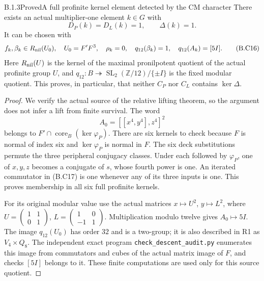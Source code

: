 \begin{result}{B.1.3}{Proved}{A full profinite kernel element detected by the CM character}
There exists an actual multiplier-one element $k\in G$ with
\[
                   D_P(k)=D_L(k)=1,\qquad\Delta(k)=1.
 \tag{B.C15}
\]
It can be chosen with
\[
 f_k,\beta_k\in R_{\rm nil}(U_0),\quad
 U_0=F'F^3,\quad \rho_k=0,\quad
 q_{12}(\beta_k)=1,\quad q_{12}(A_k)=[5I].
 \tag{B.C16}
\]
Here $R_{\rm nil}(U)$ is the kernel of the maximal
pronilpotent quotient of the actual profinite group $U$,
and $q_{12}:B\twoheadrightarrow
\operatorname{SL}_2(\mathbb Z/12)/\{\pm I\}$ is the fixed
modular quotient.  This proves, in particular, that neither
$C_P$ nor $C_L$ contains $\ker\Delta$.
\end{result}
\begin{proof}
We verify the actual source of the relative lifting theorem,
so the argument does not infer a lift from finite survival.
The word
\[
                       A_0=[[x^4,y^4],z^4]^2              \tag{B.C17}
\]
belongs to $F'\cap\operatorname{core}_B(\ker\varphi_P)$.
There are six kernels to check because $F$ is normal of
index six and $\ker\varphi_P$ is normal in $F$.
The six deck substitutions permute the three peripheral
conjugacy classes.  Under each followed by $\varphi_P$,
one of $x,y,z$ becomes a conjugate of $s$, whose fourth
power is one.  An iterated commutator in (B.C17) is one
whenever any of its three inputs is one.  This proves
membership in all six full profinite kernels.

For its original modular value use the actual matrices
$x\mapsto U^2$, $y\mapsto L^2$, where
$U=\left(\begin{smallmatrix}1&1\\0&1\end{smallmatrix}\right)$,
$L=\left(\begin{smallmatrix}1&0\\-1&1\end{smallmatrix}\right)$.
Multiplication modulo twelve gives $A_0\mapsto5I$.
The image $q_{12}(U_0)$ has order $32$ and is a two-group;
it is also described in R1 as $V_4\times Q_8$.
The independent exact program
\texttt{check\_descent\_audit.py} enumerates this image
from commutators and cubes of the actual matrix image of
$F$, and checks $[5I]$ belongs to it.  These finite
computations are used only for this source quotient.


\end{proof}
